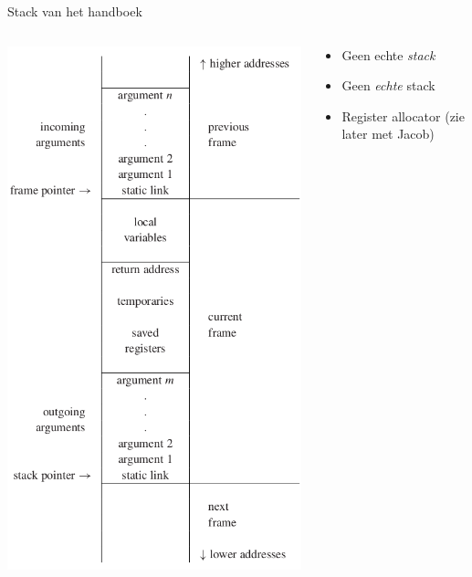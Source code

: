 \documentclass{beamer}
\begin{document}
\begin{frame}{Stack van het handboek}
\begin{columns}
    \begin{column}{.5\textwidth}
        \includegraphics[height=\textheight]{theoretical_stack.png}
    \end{column}
    \begin{column}{.5\textwidth}
        \begin{itemize}
            \item Geen echte \emph{stack}
            \item Geen \emph{echte} stack
            \item Register allocator (zie later met Jacob)
        \end{itemize}
    \end{column}
\end{columns}
\end{frame}
\end{document}
